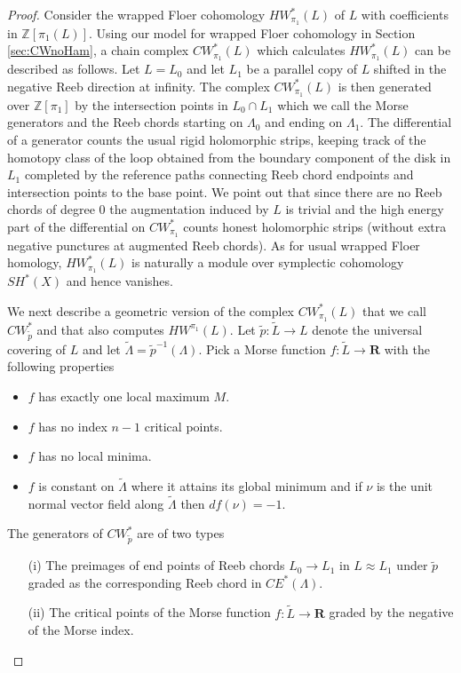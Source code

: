 \documentclass{gtpart}
\renewcommand{\Z}{\mathbb{Z}}
\renewcommand{\R}{\mathbf{R}}
\begin{document}
\begin{proof}
	Consider the wrapped Floer cohomology $HW_{\pi_1}^{\ast}(L)$ of $L$ with coefficients in $\Z[\pi_1(L)]$. Using our model for wrapped Floer cohomology in Section \ref{sec:CWnoHam}, a chain complex $CW_{\pi_{1}}^{\ast}(L)$ which calculates $HW_{\pi_{1}}^{\ast}(L)$ can be described as follows. Let $L=L_{0}$ and let $L_{1}$ be a parallel copy of $L$ shifted in the negative Reeb direction at infinity. The complex $CW_{\pi_{1}}^{\ast}(L)$ is then generated over $\Z[\pi_{1}]$ by the intersection points in $L_{0}\cap L_{1}$ which we call the Morse generators and the Reeb chords starting on $\Lambda_{0}$ and ending on $\Lambda_{1}$. The differential of a generator counts the usual rigid holomorphic strips, keeping track of the homotopy class of the loop obtained from the boundary component of the disk in $L_{1}$ completed by the reference paths connecting Reeb chord endpoints and intersection points to the base point. We point out that since there are no Reeb chords of degree $0$ the augmentation induced by $L$ is trivial and the high energy part of the differential on $CW^{\ast}_{\pi_{1}}$ counts honest holomorphic strips (without extra negative punctures at augmented Reeb chords).
	As for usual wrapped Floer homology, $HW_{\pi_{1}}^{\ast}(L)$ is naturally a module over symplectic cohomology $SH^*(X)$ and hence vanishes. 
    
    We next describe a geometric version of the complex $CW^{\ast}_{\pi_{1}}(L)$ that we call $CW^{\ast}_{\tilde p}$ and that also computes $HW^{\pi_1}(L)$. Let $\tilde p\colon\tilde L\to L$ denote the universal covering of $L$ and let $\tilde{\Lambda}=\tilde p^{-1}(\Lambda)$. Pick a Morse function $f\colon \tilde L\to\R$ with the following properties
    \begin{itemize}
    	\item $f$ has exactly one local maximum $M$. 
    	\item $f$ has no index $n-1$ critical points.
    	\item $f$ has no local minima.
    	\item $f$ is constant on $\tilde \Lambda$ where it attains its global minimum and if $\nu$ is the unit normal vector field along $\tilde{\Lambda}$ then $df(\nu)=-1$. 
    \end{itemize}
    The generators of $CW^{\ast}_{\tilde p}$ are of two types
    \begin{itemize}
    \item[(i)] The preimages of end points of Reeb chords $L_{0}\to L_{1}$ in $L\approx L_{1}$ under $\tilde p$ graded as the corresponding Reeb chord in $CE^{\ast}(\Lambda)$.
    \item[(ii)] The critical points of the Morse function $f\colon \tilde L\to \R$ graded by the negative of the Morse index.
    \end{itemize}  
    

\end{proof}
\end{document}
